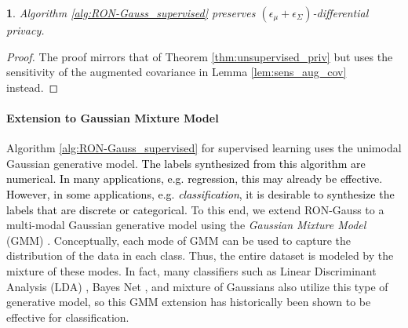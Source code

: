 \documentclass[USenglish,oneside,twocolumn]{article}
\theoremstyle{definition}
\theoremstyle{remark}
\theoremstyle{plain}
\newtheorem{thm}{\protect\theoremname}
\theoremstyle{plain}
\providecommand{\theoremname}{Theorem}
\newcommand{\chang}{\textcolor{black}}
\begin{document}
\begin{thm}
\label{thm:Algorithm2_priv}Algorithm \ref{alg:RON-Gauss_supervised}
preserves $(\epsilon_{\mu}+\epsilon_{\Sigma})$-differential privacy. 
\end{thm}
\begin{proof}
The proof mirrors that of Theorem \ref{thm:unsupervised_priv} but
uses the sensitivity of the augmented covariance in Lemma \ref{lem:sens_aug_cov}
instead.
\end{proof}

\vspace{-1em}
\paragraph{Extension to Gaussian Mixture Model}
\label{sec:gmm}

Algorithm \ref{alg:RON-Gauss_supervised} for supervised learning
uses the unimodal Gaussian generative model. \chang{The labels synthesized from this algorithm are numerical. In many applications, e.g. regression, this may already be effective. However, in some applications, e.g. \emph{classification}, it is desirable to synthesize the labels that are discrete or categorical.} To this end, we extend RON-Gauss to a multi-modal Gaussian generative model
using the \emph{Gaussian Mixture Model} (GMM) \cite{RefWorks:51,RefWorks:225}.
Conceptually, each mode of GMM can be used to capture the distribution
of the data in each class. Thus, the entire dataset is modeled by
the mixture of these modes. In fact, many classifiers such as Linear
Discriminant Analysis (LDA) \cite{RefWorks:292}, Bayes Net \cite{RefWorks:51},
and mixture of Gaussians \cite{RefWorks:51} also utilize this type
of generative model, so this GMM extension has historically been shown
to be effective for classification.
\end{document}
